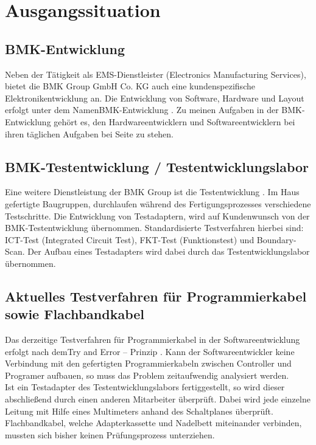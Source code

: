 

\section{Ausgangssituation}


\subsection{BMK-Entwicklung}
Neben der Tätigkeit als EMS-Dienstleister (Electronics Manufacturing Services), bietet die \glqq BMK Group GmbH  Co. KG \grqq{} auch eine kundenspezifische Elektronikentwicklung an. Die Entwicklung von Software, Hardware und Layout erfolgt unter dem Namen\glqq BMK-Entwicklung \grqq{} . 
Zu meinen Aufgaben in der BMK-Entwicklung gehört es, den Hardwareentwicklern und Softwareentwicklern bei ihren täglichen Aufgaben bei Seite zu stehen. 


\subsection{BMK-Testentwicklung / Testentwicklungslabor}
Eine weitere Dienstleistung der \glqq BMK Group \grqq{} ist die \glqq Testentwicklung \grqq{}. Im Haus gefertigte Baugruppen, durchlaufen während des Fertigungsprozesses verschiedene Testschritte. Die Entwicklung von Testadaptern, wird auf Kundenwunsch von der BMK-Testentwicklung übernommen. Standardisierte Testverfahren hierbei sind: ICT-Test (Integrated Circuit Test), FKT-Test (Funktionstest) und Boundary-Scan. Der Aufbau eines Testadapters wird dabei durch das Testentwicklungslabor übernommen. 



\subsection{Aktuelles Testverfahren für Programmierkabel sowie Flachbandkabel}
Das derzeitige Testverfahren für Programmierkabel in der Softwareentwicklung erfolgt nach dem\glqq Try and Error – Prinzip \grqq{} . Kann der Softwareentwickler keine Verbindung mit den gefertigten Programmierkabeln zwischen Controller und Programer aufbauen, so muss das Problem zeitaufwendig analysiert werden.
\\
Ist ein Testadapter des Testentwicklungslabors fertiggestellt, so wird dieser abschließend durch einen anderen Mitarbeiter überprüft. Dabei wird jede einzelne Leitung mit Hilfe eines Multimeters anhand des Schaltplanes überprüft. Flachbandkabel, welche Adapterkassette und Nadelbett miteinander verbinden, mussten sich bisher keinen Prüfungsprozess unterziehen. 

